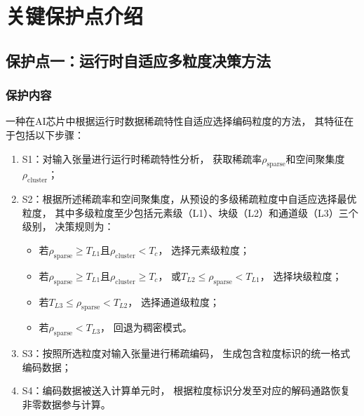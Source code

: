 \documentclass[a4paper,12pt,fontset=ubuntu]{ctexart}
\begin{document}
\section{关键保护点介绍}

\subsection{保护点一：运行时自适应多粒度决策方法}

\subsubsection{保护内容}

一种在AI芯片中根据运行时数据稀疏特性自适应选择编码粒度的方法，
其特征在于包括以下步骤：

\begin{enumerate}
  \item S1：对输入张量进行运行时稀疏特性分析，
        获取稀疏率$\rho_{\text{sparse}}$和空间聚集度$\rho_{\text{cluster}}$；

  \item S2：根据所述稀疏率和空间聚集度，从预设的多级稀疏粒度中自适应选择最优粒度，
        其中多级粒度至少包括元素级（L1）、块级（L2）和通道级（L3）三个级别，
        决策规则为：
        \begin{itemize}
          \item 若$\rho_{\text{sparse}} \geq T_{L1}$且$\rho_{\text{cluster}} < T_c$，
                选择元素级粒度；
          \item 若$\rho_{\text{sparse}} \geq T_{L1}$且$\rho_{\text{cluster}} \geq T_c$，
                或$T_{L2} \leq \rho_{\text{sparse}} < T_{L1}$，
                选择块级粒度；
          \item 若$T_{L3} \leq \rho_{\text{sparse}} < T_{L2}$，
                选择通道级粒度；
          \item 若$\rho_{\text{sparse}} < T_{L3}$，
                回退为稠密模式。
        \end{itemize}

  \item S3：按照所选粒度对输入张量进行稀疏编码，
        生成包含粒度标识的统一格式编码数据；

  \item S4：编码数据被送入计算单元时，
        根据粒度标识分发至对应的解码通路恢复非零数据参与计算。
\end{enumerate}
\end{document}

